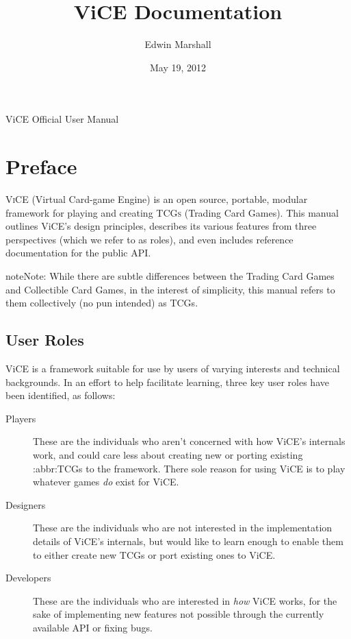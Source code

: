 \documentclass[letterpaper,10pt,english]{sphinxmanual}
\title{ViCE Documentation}
\date{May 19, 2012}
\author{Edwin Marshall}
\begin{document}
\maketitle
\tableofcontents
{}\label{index::doc}


ViCE Official User Manual


\chapter{Preface}
\label{preface::doc}\label{preface:table-of-contents}\label{preface:preface}
\textsc{ViCE} (Virtual Card-game Engine) is an open source, portable, modular
framework for playing and creating \textsc{TCGs} (Trading Card Games). This
manual outlines ViCE's design principles, describes its various features from
three perspectives (which we refer to as roles), and even includes reference
documentation for the public API.

\begin{notice}{note}{Note:}
While there are subtle differences between the Trading Card Games and
Collectible Card Games, in the interest of simplicity, this manual refers
to them collectively (no pun intended) as TCGs.
\end{notice}


\section{User Roles}
\label{preface:user-roles}
ViCE is a framework suitable for use by users
of varying interests and technical backgrounds. In an effort to help facilitate
learning, three key user roles have been identified, as follows:
\begin{description}
\item[{Players}] \leavevmode
These are the individuals who aren't concerned with how
ViCE's internals work, and could care less
about creating new or porting existing :abbr:TCGs to
the framework. There sole reason for using
ViCE is to play whatever games \emph{do}
exist for ViCE.

\item[{Designers}] \leavevmode
These are the individuals who are not interested in the
implementation details of ViCE's internals,
but would like to learn enough to enable them to either create new TCGs or
port existing ones to ViCE.

\item[{Developers}] \leavevmode
These are the individuals who are interested in \emph{how}
ViCE works, for the sake of implementing
new features not possible through the currently available API or fixing bugs.

\end{description}
\end{document}
